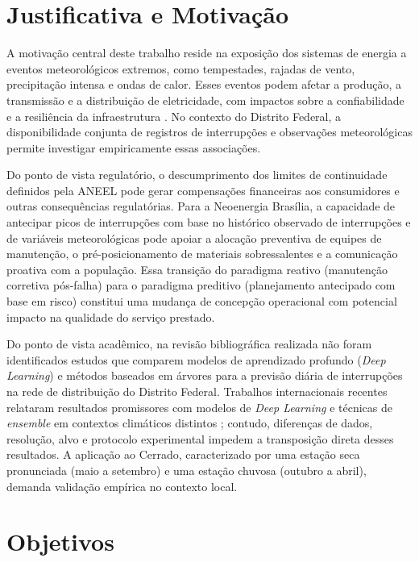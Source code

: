 \section{Justificativa e Motivação}\label{sec:justificativa}

A motivação central deste trabalho reside na exposição dos sistemas de energia a eventos meteorológicos extremos, como tempestades, rajadas de vento, precipitação intensa e ondas de calor. Esses eventos podem afetar a produção, a transmissão e a distribuição de eletricidade, com impactos sobre a confiabilidade e a resiliência da infraestrutura \cite{gomes2020impact}. No contexto do Distrito Federal, a disponibilidade conjunta de registros de interrupções e observações meteorológicas permite investigar empiricamente essas associações.

Do ponto de vista regulatório, o descumprimento dos limites de continuidade definidos pela ANEEL pode gerar compensações financeiras aos consumidores e outras consequências regulatórias. Para a Neoenergia Brasília, a capacidade de antecipar picos de interrupções com base no histórico observado de interrupções e de variáveis meteorológicas pode apoiar a alocação preventiva de equipes de manutenção, o pré-posicionamento de materiais sobressalentes e a comunicação proativa com a população. Essa transição do paradigma reativo (manutenção corretiva pós-falha) para o paradigma preditivo (planejamento antecipado com base em risco) constitui uma mudança de concepção operacional com potencial impacto na qualidade do serviço prestado.

Do ponto de vista acadêmico, na revisão bibliográfica realizada não foram identificados estudos que comparem modelos de aprendizado profundo (\textit{Deep Learning}) e métodos baseados em árvores para a previsão diária de interrupções na rede de distribuição do Distrito Federal. Trabalhos internacionais recentes relataram resultados promissores com modelos de \textit{Deep Learning} e técnicas de \textit{ensemble} em contextos climáticos distintos \cite{zhang2023deep, smith2021hybrid}; contudo, diferenças de dados, resolução, alvo e protocolo experimental impedem a transposição direta desses resultados. A aplicação ao Cerrado, caracterizado por uma estação seca pronunciada (maio a setembro) e uma estação chuvosa (outubro a abril), demanda validação empírica no contexto local.

\section{Objetivos}\label{sec:objetivos}

